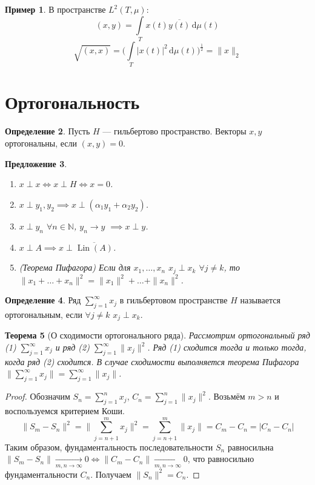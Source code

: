\documentclass[11pt,openany,a4paper]{scrartcl}
\theoremstyle{plain}
\newtheorem{theorem}{Теорема}[section]
\newtheorem{proposition}[theorem]{Предложение}
\theoremstyle{definition}
\newtheorem{definition}[theorem]{Определение}
\newtheorem{example}[theorem]{Пример}
\newcommand\mb{\mathbb}
\newcommand{\underto}[1]{\xrightarrow[#1]{}}
\newcommand{\dif}{\, \mathrm d}
\newcommand\ol{\overline}
\DeclareMathOperator{\Lin}{Lin}
\begin{document}
\begin{example}
    В пространстве $L^2(T, \mu)$:
    $$
    (x, y) = \int\limits_T x(t)\ol{y(t)}\dif \mu(t)
    $$
    $$
    \sqrt{(x, x)} = \bigg(\int\limits_T |x(t)|^2\dif \mu(t)\bigg)^\frac{1}{2} =
    \|x\|_2
    $$
\end{example}

\section{Ортогональность}

\begin{definition}
    Пусть $H$ — гильбертово пространство. Векторы $x, y$ ортогональны, если
    $(x, y) = 0$.
\end{definition}

\begin{proposition}
    \begin{enumerate}
        \item $x \perp x \iff x \perp H \iff x = 0$.
        \item $x \perp y_1, y_2 \implies x \perp (\alpha_1y_1 + \alpha_2y_2)$.
        \item $x \perp y_n$ $\forall n \in \mb N$, $y_n \to y$ $\implies
        x \perp y$.
        \item $x \perp A \implies x \perp \ol{\Lin(A)}$.
        \item (Теорема Пифагора) Если для $x_1, \ldots, x_n$ $x_j \perp x_k$
        $\forall j \neq k$, то $\|x_1 + \ldots + x_n\|^2 =
        \|x_1\|^2 + \ldots + \|x_n\|^2$.
    \end{enumerate}
\end{proposition}

\begin{definition}
    Ряд $\sum\limits_{j=1}^\infty x_j$ в гильбертовом пространстве $H$ называется
    ортогональным, если $\forall j\neq k$ $x_j \perp x_k$.
\end{definition}

\begin{theorem}[О сходимости ортогонального ряда]
\label{orthogonal_series_convergence}
    Рассмотрим ортогональный ряд (1) $\sum\limits_{j=1}^\infty x_j$ и ряд (2)
    $\sum\limits_{j=1}^\infty \|x_j\|^2$. Ряд (1) сходится тогда и только тогда,
    когда ряд (2) сходится. В случае сходимости выполняется теорема Пифагора
    $\|\sum\limits_{j=1}^\infty x_j\| = \sum\limits_{j=1}^\infty \|x_j\|$.
\end{theorem}
\begin{proof}
    Обозначим $S_n = \sum\limits_{j=1}^nx_j$,
    $C_n = \sum\limits_{j=1}^n\|x_j\|^2$. Возьмём $m > n$ и воспользуемся 
    критерием Коши.
    $$
    \|S_m - S_n\|^2 = \|\sum\limits_{j=n+1}^m x_j\|^2 =
    \sum\limits_{j=n+1}^m \|x_j\| = C_m - C_n = |C_n - C_n|
    $$
    Таким образом, фундаментальность последовательности $S_n$ равносильна
    $\|S_m - S_n\| \underto{m,n \to \infty} 0 \iff \|C_m - C_n\|
    \underto{m,n \to \infty} 0$, что равносильно фундаментальности $C_n$.
    Получаем $\|S_n\|^2 = C_n$.
\end{proof}
\end{document}
